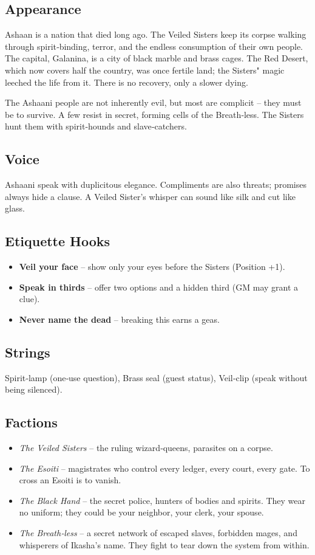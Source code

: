 \documentclass[11pt]{book}
\begin{document}
\subsection*{Appearance}
Ashaan is a nation that died long ago. The Veiled Sisters keep its corpse walking through spirit‑binding, terror, and the endless consumption of their own people. The capital, Galanina, is a city of black marble and brass cages. The Red Desert, which now covers half the country, was once fertile land; the Sisters" magic leeched the life from it. There is no recovery, only a slower dying.

The Ashaani people are not inherently evil, but most are complicit -- they must be to survive. A few resist in secret, forming cells of the Breath‑less. The Sisters hunt them with spirit‑hounds and slave‑catchers.

\subsection*{Voice}
Ashaani speak with duplicitous elegance. Compliments are also threats; promises always hide a clause. A Veiled Sister's whisper can sound like silk and cut like glass.

\subsection*{Etiquette Hooks}
\begin{itemize}
\item \textbf{Veil your face} -- show only your eyes before the Sisters (Position +1).
\item \textbf{Speak in thirds} -- offer two options and a hidden third (GM may grant a clue).
\item \textbf{Never name the dead} -- breaking this earns a geas.
\end{itemize}

\subsection*{Strings}
Spirit‑lamp (one‑use question), Brass seal (guest status), Veil‑clip (speak without being silenced).

\subsection*{Factions}
\begin{itemize}
\item \emph{The Veiled Sisters} -- the ruling wizard‑queens, parasites on a corpse.
\item \emph{The Esoiti} -- magistrates who control every ledger, every court, every gate. To cross an Esoiti is to vanish.
\item \emph{The Black Hand} -- the secret police, hunters of bodies and spirits. They wear no uniform; they could be your neighbor, your clerk, your spouse.
\item \emph{The Breath‑less} -- a secret network of escaped slaves, forbidden mages, and whisperers of Ikasha's name. They fight to tear down the system from within.
\end{itemize}
\end{document}
